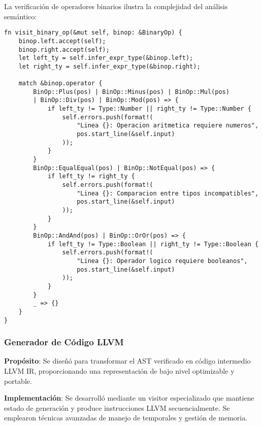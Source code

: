 \documentclass[12pt,a4paper]{article}
\begin{document}
La verificación de operadores binarios ilustra la complejidad del análisis semántico:

\begin{lstlisting}[style=rustcode,caption=Verificación de operadores binarios]
fn visit_binary_op(&mut self, binop: &BinaryOp) {
    binop.left.accept(self);
    binop.right.accept(self);
    let left_ty = self.infer_expr_type(&binop.left);
    let right_ty = self.infer_expr_type(&binop.right);

    match &binop.operator {
        BinOp::Plus(pos) | BinOp::Minus(pos) | BinOp::Mul(pos) 
        | BinOp::Div(pos) | BinOp::Mod(pos) => {
            if left_ty != Type::Number || right_ty != Type::Number {
                self.errors.push(format!(
                    "Linea {}: Operacion aritmetica requiere numeros", 
                    pos.start_line(&self.input)
                ));
            }
        }
        BinOp::EqualEqual(pos) | BinOp::NotEqual(pos) => {
            if left_ty != right_ty {
                self.errors.push(format!(
                    "Linea {}: Comparacion entre tipos incompatibles", 
                    pos.start_line(&self.input)
                ));
            }
        }
        BinOp::AndAnd(pos) | BinOp::OrOr(pos) => {
            if left_ty != Type::Boolean || right_ty != Type::Boolean {
                self.errors.push(format!(
                    "Linea {}: Operador logico requiere booleanos", 
                    pos.start_line(&self.input)
                ));
            }
        }
        _ => {}
    }
}
\end{lstlisting}

\subsubsection{Generador de Código LLVM}

\textbf{Propósito}: Se diseñó para transformar el AST verificado en código intermedio LLVM IR, proporcionando una representación de bajo nivel optimizable y portable.

\textbf{Implementación}: Se desarrolló mediante un visitor especializado que mantiene estado de generación y produce instrucciones LLVM secuencialmente. Se emplearon técnicas avanzadas de manejo de temporales y gestión de memoria.
\end{document}
